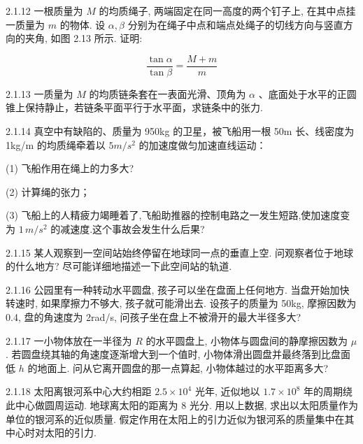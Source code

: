 \begin{problem}{2.1.12}
一根质量为 $M$ 的均质绳子, 两端固定在同一高度的两个钉子上, 在其中点挂一质量为 $m$ 的物体. 设 $\alpha, \beta$ 分别为在绳子中点和端点处绳子的切线方向与竖直方向的夹角, 如图 2.13 所示. 证明:

\[
\frac {\tan \alpha}{\tan \beta} = \frac {M + m}{m}
\]
\begin{center}

\end{center}
\end{problem}
\clearpage


\begin{problem}{2.1.13}
一质量为 $M$ 的均质链条套在一表面光滑、顶角为 $\alpha$ 、底面处于水平的正圆锥上保持静止，若链条平面平行于水平面，求链条中的张力.
\end{problem}
\clearpage


\begin{problem}{2.1.14}
真空中有缺陷的、质量为 950kg 的卫星，被飞船用一根 50m 长、线密度为 1kg/m 的均质绳牵着以 $5m/s^{2}$ 的加速度做匀加速直线运动：

(1) 飞船作用在绳上的力多大?

(2) 计算绳的张力；

(3) 飞船上的人精疲力竭睡着了,飞船助推器的控制电路之一发生短路,使加速度变为 $1 \, m/s^{2}$ 的减速度.这个事故会发生什么后果?
\end{problem}
\clearpage


\begin{problem}{2.1.15}
某人观察到一空间站始终停留在地球同一点的垂直上空. 问观察者位于地球的什么地方? 尽可能详细地描述一下此空间站的轨道.
\end{problem}
\clearpage


\begin{problem}{2.1.16}
公园里有一种转动水平圆盘, 孩子可以坐在盘面上任何地方. 当盘开始加快转速时, 如果摩擦力不够大, 孩子就可能滑出去. 设孩子的质量为 50kg, 摩擦因数为 0.4, 盘的角速度为 2rad/s, 问孩子坐在盘上不被滑开的最大半径多大?
\end{problem}
\clearpage


\begin{problem}{2.1.17}
一小物体放在一半径为 $R$ 的水平圆盘上, 小物体与圆盘间的静摩擦因数为 $\mu$ . 若圆盘绕其轴的角速度逐渐增大到一个值时, 小物体滑出圆盘并最终落到比盘面低 $h$ 的地面上. 问从它离开圆盘的那一点算起, 小物体越过的水平距离多大?
\end{problem}
\clearpage


\begin{problem}{2.1.18}
太阳离银河系中心大约相距 $2.5 \times 10^{4}$ 光年, 近似地以 $1.7 \times 10^{8}$ 年的周期绕此中心做圆周运动. 地球离太阳的距离为 8 光分. 用以上数据, 求出以太阳质量作为单位的银河系的近似质量. 假定作用在太阳上的引力近似为银河系的质量集中在其中心时对太阳的引力.
\end{problem}
\clearpage


